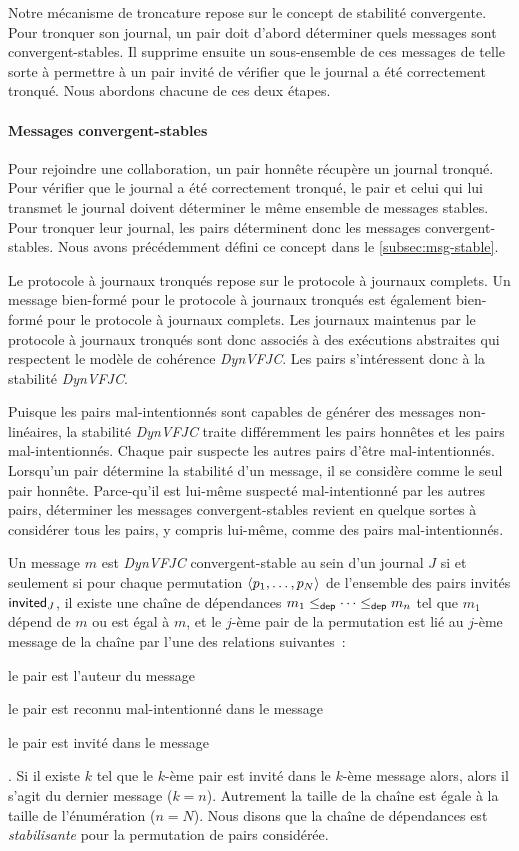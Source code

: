 Notre mécanisme de troncature repose sur le concept de stabilité convergente.
Pour tronquer son journal, un pair doit d'abord déterminer quels messages sont convergent-stables.
Il supprime ensuite un sous-ensemble de ces messages de telle sorte à permettre à un pair invité de vérifier que le journal a été correctement tronqué.
Nous abordons chacune de ces deux étapes.

\paragraph{Messages convergent-stables}
Pour rejoindre une collaboration, un pair honnête récupère un journal tronqué.
Pour vérifier que le journal a été correctement tronqué, le pair et celui qui lui transmet le journal doivent déterminer le même ensemble de messages stables.
Pour tronquer leur journal, les pairs déterminent donc les messages convergent-stables.
Nous avons précédemment défini ce concept dans le \autoref{subsec:msg-stable}.

Le protocole à journaux tronqués repose sur le protocole à journaux complets.
Un message bien-formé pour le protocole à journaux tronqués est également bien-formé pour le protocole à journaux complets.
Les journaux maintenus par le protocole à journaux tronqués sont donc associés à des exécutions abstraites qui respectent le modèle de cohérence \emph{DynVFJC}.
Les pairs s'intéressent donc à la stabilité \emph{DynVFJC}.

Puisque les pairs mal-intentionnés sont capables de générer des messages non-linéaires, la stabilité \emph{DynVFJC} traite différemment les pairs honnêtes et les pairs mal-intentionnés.
Chaque pair suspecte les autres pairs d'être mal-intentionnés.
Lorsqu'un pair détermine la stabilité d'un message, il se considère comme le seul pair honnête.
Parce-qu'il est lui-même suspecté mal-intentionné par les autres pairs, déterminer les messages convergent-stables revient en quelque sortes à considérer tous les pairs, y compris lui-même, comme des pairs mal-intentionnés.

Un message $m$ est \emph{DynVFJC} convergent-stable au sein d'un journal $J$ si et seulement si pour chaque permutation $\langle p_1, \dotsc, p_N\rangle$ de l'ensemble des pairs invités $\operatorname{\mathsf{invited}}_J$, il existe une chaîne de dépendances $m_1 \leq_{\operatorname{\mathsf{dep}}} \dotsb \leq_{\operatorname{\mathsf{dep}}} m_n$ tel que $m_1$ dépend de $m$ ou est égal à $m$, et le $j$-ème pair de la permutation est lié au $j$-ème message de la chaîne par l'une des relations suivantes~: \begin{inlinelist}
    \item le pair est l'auteur du message
    \item le pair est reconnu mal-intentionné dans le message
    \item le pair est invité dans le message
\end{inlinelist}.
Si il existe $k$ tel que le $k$-ème pair est invité dans le $k$-ème message alors, alors il s'agit du dernier message ($k = n$).
Autrement la taille de la chaîne est égale à la taille de l'énumération ($n = N$).
Nous disons que la chaîne de dépendances est \emph{stabilisante} pour la permutation de pairs considérée.

